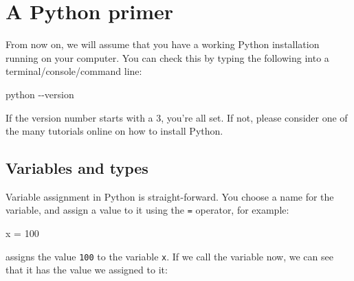 \documentclass[
  a4paperpaper,
  ,captions=tableheading
]{scrbook}
\newenvironment{Shaded}{\begin{snugshade}}{\end{snugshade}}
\newcommand{\DecValTok}[1]{\textcolor[rgb]{0.68,0.00,0.00}{#1}}
\newcommand{\NormalTok}[1]{\textcolor[rgb]{0.00,0.23,0.31}{#1}}
\newcommand{\OperatorTok}[1]{\textcolor[rgb]{0.37,0.37,0.37}{#1}}
\begin{document}
\hypertarget{sec-python_primer}{%
\chapter{A Python primer}\label{sec-python_primer}}

\begin{tcolorbox}[enhanced jigsaw, arc=.35mm, colbacktitle=quarto-callout-note-color!10!white, colback=white, breakable, toprule=.15mm, title=\textcolor{quarto-callout-note-color}{\faInfo}\hspace{0.5em}{Note}, left=2mm, bottomtitle=1mm, toptitle=1mm, leftrule=.75mm, opacitybacktitle=0.6, titlerule=0mm, opacityback=0, rightrule=.15mm, bottomrule=.15mm, coltitle=black, colframe=quarto-callout-note-color-frame]

From now on, we will assume that you have a working Python installation
running on your computer. You can check this by typing the following
into a terminal/console/command line:

\begin{Shaded}
\begin{Highlighting}[]
\NormalTok{python {-}{-}version}
\end{Highlighting}
\end{Shaded}

If the version number starts with a 3, you're all set. If not, please
consider one of the many tutorials online on how to install Python.

\end{tcolorbox}

\hypertarget{variables-and-types}{%
\section{Variables and types}\label{variables-and-types}}

Variable assignment in Python is straight-forward. You choose a name for
the variable, and assign a value to it using the \texttt{=} operator,
for example:

\begin{Shaded}
\begin{Highlighting}[]
\NormalTok{x }\OperatorTok{=} \DecValTok{100}
\end{Highlighting}
\end{Shaded}

assigns the value \texttt{100} to the variable \texttt{x}. If we call
the variable now, we can see that it has the value we assigned to it:
\end{document}
